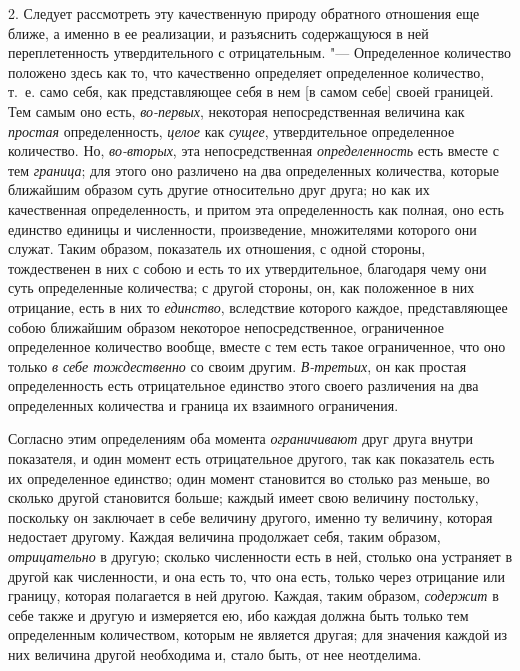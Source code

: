 2. Следует рассмотреть эту качественную природу обратного отношения еще
ближе, а именно в ее реализации, и разъяснить содержащуюся в ней
переплетенность утвердительного с отрицательным. "--- Определенное количество
положено здесь как то, что качественно определяет определенное
количество, т.~е. само себя, как представляющее себя в нем [в самом себе]
своей границей. Тем самым оно есть, {\em во-первых},
некоторая непосредственная величина как {\em простая}
определенность, {\em целое} как
{\em сущее}, утвердительное определенное количество.
Но, {\em во-вторых}, эта непосредственная
{\em определенность} есть вместе с тем
{\em граница}; для этого оно различено на два
определенных количества, которые ближайшим образом суть другие относительно
друг друга; но как их качественная определенность, и притом эта
определенность как полная, оно есть единство единицы и численности,
произведение, множителями которого они служат. Таким образом, показатель их
отношения, с одной стороны, тождественен в них с собою и есть то их
утвердительное, благодаря чему они суть определенные количества; с другой
стороны, он, как положенное в них отрицание, есть в них то
{\em единство}, вследствие которого каждое,
представляющее собою ближайшим образом некоторое непосредственное,
ограниченное определенное количество вообще, вместе с тем есть такое
ограниченное, что оно только {\em в себе тождественно}
со своим другим. {\em В-третьих}, он как простая
определенность есть отрицательное единство этого своего различения на два
определенных количества и граница их взаимного ограничения.

Согласно этим определениям оба момента
{\em ограничивают} друг друга внутри показателя, и один
момент есть отрицательное другого, так как показатель есть их определенное
единство; один момент становится во столько раз меньше, во сколько другой
становится больше; каждый имеет свою величину постольку, поскольку он
заключает в себе величину другого, именно ту величину, которая недостает
другому. Каждая величина продолжает себя, таким образом,
{\em отрицательно} в другую; сколько численности есть в
ней, столько она устраняет в другой как численности, и она есть то, что она
есть, только через отрицание или границу, которая полагается в ней другою.
Каждая, таким образом, {\em содержит} в себе также и
другую и измеряется ею, ибо каждая должна быть только тем определенным
количеством, которым не является другая; для значения каждой из них
величина другой необходима и, стало быть, от нее неотделима.

